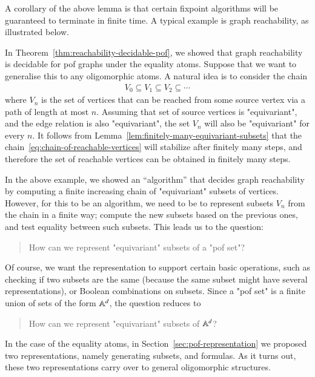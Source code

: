 A corollary of the above lemma is that certain fixpoint algorithms will be guaranteed to terminate in finite time. A typical example is graph reachability, as illustrated below.


\begin{myexample}\label{ex:reachability}
	In Theorem~\ref{thm:reachability-decidable-pof}, we showed that graph reachability is decidable  for pof graphs under the equality atoms. Suppose that we want to generalise this to any oligomorphic atoms. A natural idea is to consider the chain
	\begin{align}\label{eq:chain-of-reachable-vertices}
	V_0 \subseteq V_1 \subseteq V_2 \subseteq \cdots
	\end{align}
	where $V_n$ is the set of vertices that can be reached from some source vertex via a path of length at most $n$. 
	Assuming that 
	 set of source vertices is "equivariant", and the edge relation is also "equivariant", the set $V_n$ will also be "equivariant" for every $n$. It follows from Lemma~\ref{lem:finitely-many-equivariant-subsets} that the chain~\eqref{eq:chain-of-reachable-vertices} will stabilize after finitely many steps, and therefore the set of reachable vertices can be obtained in finitely many steps. 		
\end{myexample}


In the above example, we showed an ``algorithm'' that decides graph reachability by computing a finite increasing chain of "equivariant" subsets of vertices. However, for this to be an algorithm, we need to be to represent subsets $V_n$ from the chain in a finite way; compute the new subsets based on the previous ones, and test equality between such subsets. 
This leads us to the question: 
\begin{quotation}
	How can we represent "equivariant" subsets of a "pof set"?
\end{quotation} 
Of course, we want the representation to support certain basic operations, such as checking if two subsets are the same (because the same subset might have several representations), or Boolean combinations on subsets. Since a "pof set" is a finite union of sets of the form $\mathbb A^d$, the question reduces to
\begin{quotation}
	How can we represent "equivariant" subsets of $\mathbb A^d$?
\end{quotation}
In the case of the equality atoms, in   Section~\ref{sec:pof-representation} we proposed two representations, namely  generating subsets, and formulas. As it turns out, these two representations carry over to general oligomorphic structures. 

